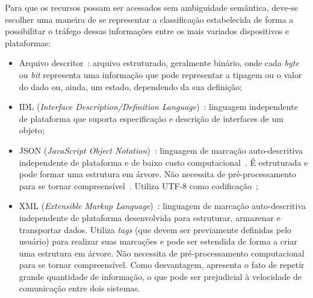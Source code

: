 Para que os recursos possam ser acessados sem ambiguidade semântica, deve-se escolher uma maneira de se representar a classificação estabelecida de forma a possibilitar o tráfego dessas informações entre os mais variados dispositivos e plataformas:

\begin{itemize}
	\item Arquivo descritor~\cite{usb3spec}: arquivo estruturado, geralmente binário, onde cada \emph{byte} ou \emph{bit} representa uma informação que pode representar a tipagem ou o valor do dado ou, ainda, um estado, dependendo da sua definição;
	

	
	\item IDL (\emph{Interface Description/Definition Language})~\cite{davidIDL}: linguagem independente de plataforma que suporta especificação e descrição de interfaces de um objeto;

	\item JSON (\emph{JavaScript Object Notation})~\cite{json}: linguagem de marcação auto-descritiva independente de plataforma e de baixo custo computacional~\cite{comparativojson}. É estruturada e pode formar uma estrutura em árvore. Não necessita de pré-processamento para se tornar compreensível~\cite{comparativojson}. Utiliza UTF-8 como codificação~\cite{utf8};
	

	\item XML (\emph{Extensible Markup Language})~\cite{xml}: linguagem de marcação auto-descritiva independente de plataforma desenvolvida para estruturar, armazenar e transportar dados. Utiliza \emph{tags} (que devem ser previamente definidas pelo usuário) para realizar suas marcações e pode ser estendida de forma a criar uma estrutura em árvore. Não necessita de pré-processamento computacional para se tornar compreensível. Como desvantagem, apresenta o fato de repetir grande quantidade de informação, o que pode ser prejudicial à velocidade de comunicação entre dois sistemas.
\end{itemize}

